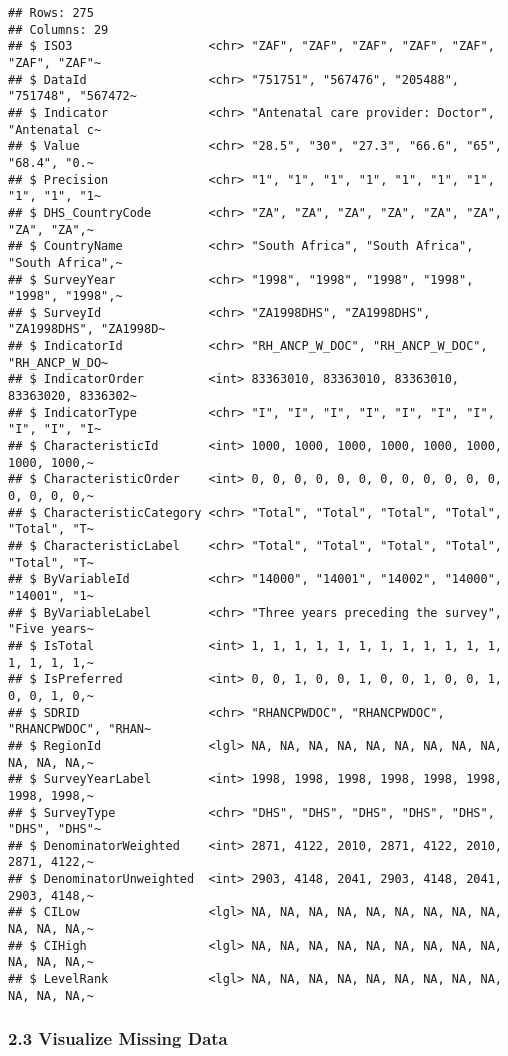 \documentclass[
]{article}
\begin{document}
\begin{verbatim}
## Rows: 275
## Columns: 29
## $ ISO3                   <chr> "ZAF", "ZAF", "ZAF", "ZAF", "ZAF", "ZAF", "ZAF"~
## $ DataId                 <chr> "751751", "567476", "205488", "751748", "567472~
## $ Indicator              <chr> "Antenatal care provider: Doctor", "Antenatal c~
## $ Value                  <chr> "28.5", "30", "27.3", "66.6", "65", "68.4", "0.~
## $ Precision              <chr> "1", "1", "1", "1", "1", "1", "1", "1", "1", "1~
## $ DHS_CountryCode        <chr> "ZA", "ZA", "ZA", "ZA", "ZA", "ZA", "ZA", "ZA",~
## $ CountryName            <chr> "South Africa", "South Africa", "South Africa",~
## $ SurveyYear             <chr> "1998", "1998", "1998", "1998", "1998", "1998",~
## $ SurveyId               <chr> "ZA1998DHS", "ZA1998DHS", "ZA1998DHS", "ZA1998D~
## $ IndicatorId            <chr> "RH_ANCP_W_DOC", "RH_ANCP_W_DOC", "RH_ANCP_W_DO~
## $ IndicatorOrder         <int> 83363010, 83363010, 83363010, 83363020, 8336302~
## $ IndicatorType          <chr> "I", "I", "I", "I", "I", "I", "I", "I", "I", "I~
## $ CharacteristicId       <int> 1000, 1000, 1000, 1000, 1000, 1000, 1000, 1000,~
## $ CharacteristicOrder    <int> 0, 0, 0, 0, 0, 0, 0, 0, 0, 0, 0, 0, 0, 0, 0, 0,~
## $ CharacteristicCategory <chr> "Total", "Total", "Total", "Total", "Total", "T~
## $ CharacteristicLabel    <chr> "Total", "Total", "Total", "Total", "Total", "T~
## $ ByVariableId           <chr> "14000", "14001", "14002", "14000", "14001", "1~
## $ ByVariableLabel        <chr> "Three years preceding the survey", "Five years~
## $ IsTotal                <int> 1, 1, 1, 1, 1, 1, 1, 1, 1, 1, 1, 1, 1, 1, 1, 1,~
## $ IsPreferred            <int> 0, 0, 1, 0, 0, 1, 0, 0, 1, 0, 0, 1, 0, 0, 1, 0,~
## $ SDRID                  <chr> "RHANCPWDOC", "RHANCPWDOC", "RHANCPWDOC", "RHAN~
## $ RegionId               <lgl> NA, NA, NA, NA, NA, NA, NA, NA, NA, NA, NA, NA,~
## $ SurveyYearLabel        <int> 1998, 1998, 1998, 1998, 1998, 1998, 1998, 1998,~
## $ SurveyType             <chr> "DHS", "DHS", "DHS", "DHS", "DHS", "DHS", "DHS"~
## $ DenominatorWeighted    <int> 2871, 4122, 2010, 2871, 4122, 2010, 2871, 4122,~
## $ DenominatorUnweighted  <int> 2903, 4148, 2041, 2903, 4148, 2041, 2903, 4148,~
## $ CILow                  <lgl> NA, NA, NA, NA, NA, NA, NA, NA, NA, NA, NA, NA,~
## $ CIHigh                 <lgl> NA, NA, NA, NA, NA, NA, NA, NA, NA, NA, NA, NA,~
## $ LevelRank              <lgl> NA, NA, NA, NA, NA, NA, NA, NA, NA, NA, NA, NA,~
\end{verbatim}

\subsubsection{2.3 Visualize Missing Data}\label{visualize-missing-data}
\end{document}
